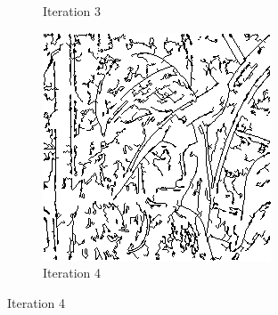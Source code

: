 \documentclass{llncs}
\begin{document}
\begin{figure}
\begin{subfigure}[b]{0.3\textwidth}
                \caption{Iteration 3}
                \label{fig:rand_iter3}
        \end{subfigure}
        \quad
        \begin{subfigure}[b]{0.3\textwidth}
                \includegraphics[width=\textwidth]{IMG/RandomInit/Iteration4}
                \caption{Iteration 4}
                \label{fig:rand_iter4}
        \end{subfigure}
        
        \vspace{5mm}
        

\end{figure}
\end{document}

